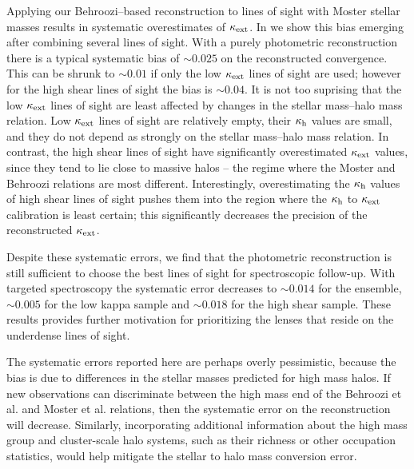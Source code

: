 \documentclass[useAMS,usenatbib,a4paper]{mn2e}
\begin{document}
{Applying our Behroozi--based reconstruction to lines of sight with Moster
stellar masses results in systematic overestimates of $\kappa_{\rm ext}$. In
 we show this bias emerging after combining several lines
of sight. With a purely photometric reconstruction there is a typical
systematic bias of $\sim 0.025$ on the reconstructed convergence. This can be
shrunk to $\sim 0.01$ if only the low $\kappa_{\rm ext}$ lines of sight are used;
however for the high shear lines of sight the bias is $\sim 0.04$. It is not
too suprising that the low $\kappa_{\rm ext}$ lines of sight are least affected by
changes in the stellar mass--halo mass relation. Low $\kappa_{\rm ext}$ lines of sight
are relatively empty, their $\kappa_{\rm h}$ values are small, and they do not depend
as strongly on the stellar mass--halo mass relation. In contrast, the high
shear lines of sight have significantly overestimated $\kappa_{\rm ext}$ values, since
they tend to lie close to massive halos -- the regime where the Moster
and Behroozi relations are most different. Interestingly, overestimating the
$\kappa_{\rm h}$ values of high shear lines of sight pushes them into the region
where the $\kappa_{\rm h}$ to $\kappa_{\rm ext}$ calibration is least certain; this 
significantly decreases the precision of the reconstructed $\kappa_{\rm ext}$. 

Despite these systematic errors, we find that the photometric reconstruction
is still sufficient to choose the best lines of sight for spectroscopic
follow-up. With targeted spectroscopy the systematic error decreases to $\sim
0.014$ for the ensemble, $\sim 0.005$ for the low kappa sample and $\sim
0.018$ for the high shear sample. These results provides further motivation for
prioritizing the lenses that reside on the underdense lines of sight.

The systematic errors reported here are perhaps overly pessimistic, because
the bias is due to differences in the stellar masses predicted for high mass
halos. If new observations can discriminate between the high mass end of the
Behroozi et al. and Moster et al. relations, then the
systematic error on the reconstruction will decrease. Similarly, incorporating
additional information about the high mass group and cluster-scale halo
systems, such as their richness or other occupation statistics, would help
mitigate the stellar to halo mass conversion error. }

\end{document}
